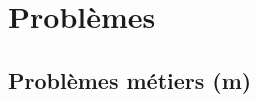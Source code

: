 
\newpage
\section{Problèmes}\label{sec:prob}



\subsection{Problèmes métiers (m)}\label{sec:pmetiers}


